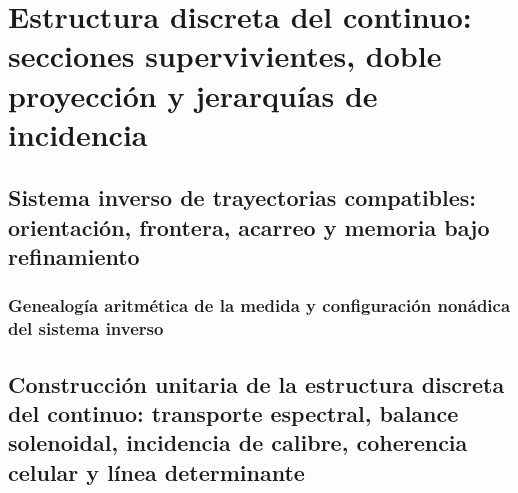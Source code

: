 

\part{Estructura discreta del continuo: secciones supervivientes, doble proyección y jerarquías de incidencia}

\chapter{Sistema inverso de trayectorias compatibles: orientación, frontera, acarreo y memoria bajo refinamiento}
\label{chap:sucesor-102-04}
\label{owner:sucesor-102-04b-cadena-conjunta-inicio}
\section{Genealogía aritmética de la medida y configuración nonádica del sistema inverso}
\begin{HMTScientificOwnerSubordinated}

\end{HMTScientificOwnerSubordinated}















\chapter{Construcción unitaria de la estructura discreta del continuo: transporte espectral, balance solenoidal, incidencia de calibre, coherencia celular y línea determinante}
\label{chap:sucesor-102-05}
\label{owner:sucesor-102-04b1-04b2-unicos}












